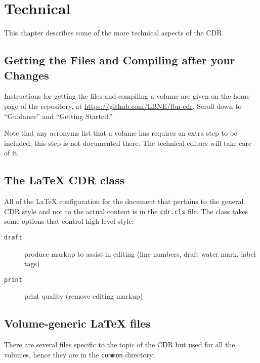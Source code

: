 \chapter{Technical}

This chapter describes some of the more technical aspects of the CDR.

\section{Getting the Files and Compiling after your Changes}

Instructions for getting the files and compiling a volume are given on the home page of the repository, at
\href{https://github.com/LBNE/lbn-cdr}{https://github.com/LBNE/lbn-cdr}. Scroll down to 
``Guidance'' and ``Getting Started.''

Note that any acronyms list that a volume has requires an extra step to be included; this step
is not documented there.
The technical editors will take care of it.

\section{The \LaTeX{} CDR class}

All of the \LaTeX{} configuration for the document that pertains to the general CDR style and not to the actual content is in the \texttt{cdr.cls} file.  The class takes some options that control high-level style:

\begin{description}
\item[\texttt{draft}] produce markup to assist in editing (line numbers, draft water mark, label tags)
\item[\texttt{print}] print quality (remove editing markup)
\end{description}

\section{Volume-generic \LaTeX{} files}

There are several files specific to the topic of the CDR but used for all the volumes, hence 
they are in the \texttt{common} directory:

